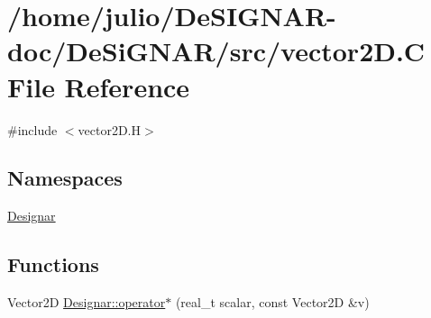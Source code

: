 \hypertarget{vector2_d_8_c}{}\section{/home/julio/\+De\+S\+I\+G\+N\+A\+R-\/doc/\+De\+Si\+G\+N\+A\+R/src/vector2D.C File Reference}
\label{vector2_d_8_c}
{\ttfamily \#include $<$vector2\+D.\+H$>$}\newline
\subsection*{Namespaces}
\begin{DoxyCompactItemize}
\item 
 \hyperlink{namespace_designar}{Designar}
\end{DoxyCompactItemize}
\subsection*{Functions}
\begin{DoxyCompactItemize}
\item 
Vector2D \hyperlink{namespace_designar_a4b2db2e125d6ac9edf439f63804ba674}{Designar\+::operator$\ast$} (real\+\_\+t scalar, const Vector2D \&v)
\end{DoxyCompactItemize}
